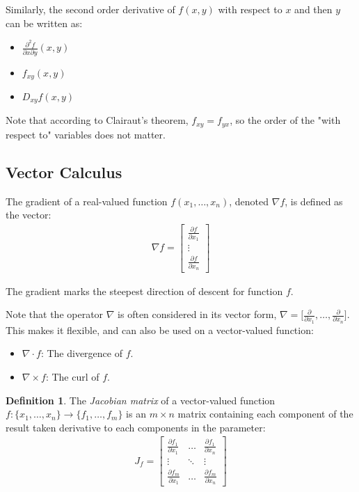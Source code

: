 \documentclass[12pt]{article}
\theoremstyle{definition}
\newtheorem{defn}{Definition}[section]
\newcommand{\bras}[1]{\lbrace #1 \rbrace}
\newcommand{\braks}[1]{\lbrack #1 \rbrack}
\begin{document}
 	Similarly, the second order derivative of $f(x, y)$ with respect to $x$ and then $y$ can be written as:
 	\begin{itemize}
 		\item $\frac{\partial^2 f}{\partial x \partial y}(x, y)$
 		\item $f_{xy}(x, y)$
 		\item $D_{xy}f(x, y)$
 	\end{itemize}
 	
 	Note that according to Clairaut's theorem, $f_{xy} = f_{yx}$, so the order of the "with respect to" variables does not matter.
 	
 	\subsection{Vector Calculus}
 	
 	The gradient of a real-valued function $f(x_1, \dots, x_n)$, denoted $\nabla f$, is defined as the vector:
 	\begin{gather*}
 	\nabla f = 
	\begin{bmatrix}
 		\frac{\partial f}{\partial x_1} \\
 		\vdots \\
 		\frac{\partial f}{\partial x_n}
 	\end{bmatrix}
 	\end{gather*}
 	
 	The gradient marks the steepest direction of descent for function $f$.
 	
 	Note that the operator $\nabla$ is often considered in its vector form, $\nabla = \braks{\frac{\partial}{\partial x_1}, \dots, \frac{\partial}{\partial x_n}}$. This makes it flexible, and can also be used on a vector-valued function:
 	\begin{itemize}
 		\item $\nabla \cdot f$: The divergence of $f$.
 		\item $\nabla \times f$: The curl of $f$.
 	\end{itemize}
 	
 	\begin{defn}
 		The \emph{Jacobian matrix} of a vector-valued function $f : \bras{x_1, \dots, x_n} \to \bras{f_1, \dots, f_m}$ is an $m \times n$ matrix containing each component of the result taken derivative to each components in the parameter:
 		\begin{gather*}
 		J_f = 
 		\begin{bmatrix}
 			\frac{\partial f_1}{\partial x_1} & \dots & \frac{\partial f_1}{\partial x_n} \\
 			\vdots & \ddots & \vdots \\
 			\frac{\partial f_m}{\partial x_1} & \dots & \frac{\partial f_m}{\partial x_n}
 		\end{bmatrix}
 		\end{gather*}
 	\end{defn}
 	
\end{document}
